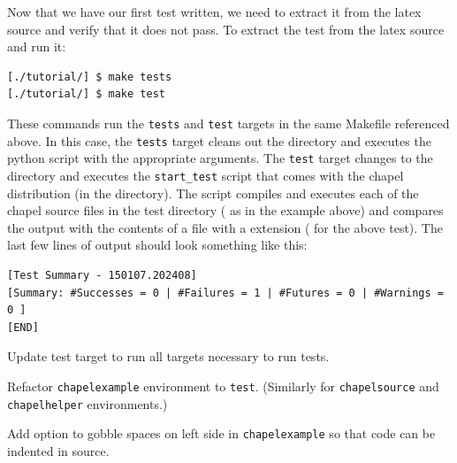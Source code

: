 \begin{seamlessnote}
    Now that we have our first test written, we need to extract it from the latex source and verify
    that it does not pass.
    To extract the test from the latex source and run it:
    \begin{verbatim}
[./tutorial/] $ make tests
[./tutorial/] $ make test
    \end{verbatim}
    These commands run the \verb|tests| and \verb|test| targets in the same Makefile referenced above.
    In this case, the \verb|tests| target cleans out the  directory and
    executes the  python script with the appropriate arguments.
    The \verb|test| target changes to the  directory and 
    executes the \verb|start_test| script that comes with
    the chapel distribution (in the  directory). The script compiles 
      and executes each of the
    chapel source files in the test directory 
    (\eg {} as in the example above) 
    and compares the output with the contents of a file with a  extension
    (\eg {} for the above test). 
    The last few lines of output should look something like this:
    \begin{verbatim}
[Test Summary - 150107.202408]
[Summary: #Successes = 0 | #Failures = 1 | #Futures = 0 | #Warnings = 0 ]
[END]
    \end{verbatim}
  \end{seamlessnote}

  \begin{TODO}
    Update test target to run all targets necessary to run tests.
  \end{TODO}
  \begin{TODO}
    Refactor \verb|chapelexample| environment to \verb|test|.  (Similarly for 
      \verb|chapelsource| and \verb|chapelhelper| environments.)
  \end{TODO}
  \begin{TODO}
    Add option to gobble spaces on left side in \verb|chapelexample| so that code can be
    indented in source.
  \end{TODO}

